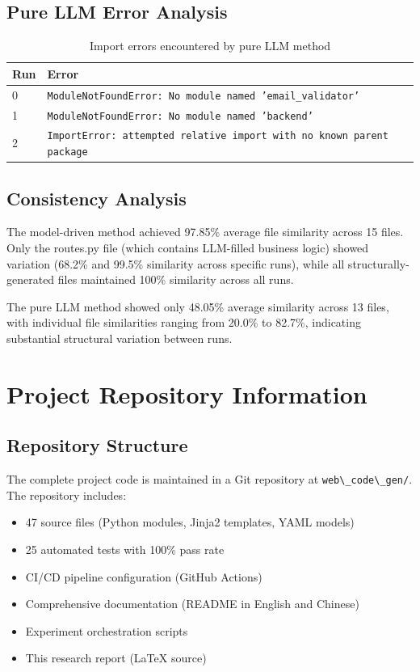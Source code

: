 \documentclass[11pt,a4paper]{article}
\begin{document}
{\subsection{Pure LLM Error Analysis}

\begin{table}[H]
\centering
\caption{Import errors encountered by pure LLM method}
\label{tab:pllmerrors}
\begin{tabular}{lp{8cm}}
\toprule
\textbf{Run} & \textbf{Error} \\
\midrule
0 & \texttt{ModuleNotFoundError: No module named 'email\_validator'} \\
1 & \texttt{ModuleNotFoundError: No module named 'backend'} \\
2 & \texttt{ImportError: attempted relative import with no known parent package} \\
\bottomrule
\end{tabular}
\end{table}

\subsection{Consistency Analysis}

The model-driven method achieved 97.85\% average file similarity across 15 files. Only the routes.py file (which contains LLM-filled business logic) showed variation (68.2\% and 99.5\% similarity across specific runs), while all structurally-generated files maintained 100\% similarity across all runs.

The pure LLM method showed only 48.05\% average similarity across 13 files, with individual file similarities ranging from 20.0\% to 82.7\%, indicating substantial structural variation between runs.

\newpage
\section{Project Repository Information}
\label{sec:repo}

\subsection{Repository Structure}

The complete project code is maintained in a Git repository at {\lstinline|web\_code\_gen/|}. The repository includes:

\begin{itemize}
    \item 47 source files (Python modules, Jinja2 templates, YAML models)
    \item 25 automated tests with 100\% pass rate
    \item CI/CD pipeline configuration (GitHub Actions)
    \item Comprehensive documentation (README in English and Chinese)
    \item Experiment orchestration scripts
    \item This research report (LaTeX source)
\end{itemize}

}
\end{document}
